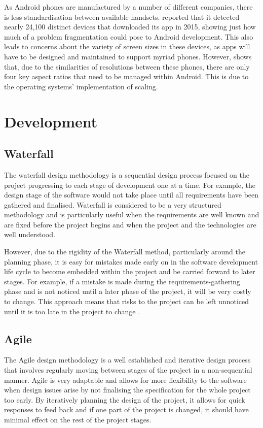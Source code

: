 As Android phones are manufactured by a number of different companies, there is less standardisation between available handsets. 
\cite{uniqueandroiddevices} reported that it detected nearly 24,100 distinct devices that downloaded its app in 2015, showing just how much of a problem fragmentation could pose to Android development.
This also leads to concerns about the variety of screen sizes in these devices, as apps will have to be designed and maintained to support myriad phones. 
However, \cite{androidscreenfragmentation} shows that, due to the similarities of resolutions between these phones, there are only four key aspect ratios that need to be managed within Android. This is due to the operating systems' implementation of scaling.

\section{Development}
\subsection{Waterfall}
The waterfall design methodology is a sequential design process focused on the project progressing to each stage of development one at a time. 
For example, the design stage of the software would not take place until all requirements have been gathered and finalised.
Waterfall is considered to be a very structured methodology and is particularly useful when the requirements are well known and are fixed before the project begins and when the project and the technologies are well understood.

However, due to the rigidity of the Waterfall method, particularly around the planning phase, it is easy for mistakes made early on in the software development life cycle to become embedded within the project and be carried forward to later stages.
For example, if a mistake is made during the requirements-gathering phase and is not noticed until a later phase of the project, it will be very costly to change.
This approach means that risks to the project can be left unnoticed until it is too late in the project to change \citep{kruchten2001waterfall}. %

\subsection{Agile}
The Agile design methodology is a well established and iterative design process that involves regularly moving between stages of the project in a non-sequential manner. 
Agile is very adaptable and allows for more flexibility to the software when design issues arise by not finalising the specification for the whole project too early.
By iteratively planning the design of the project, it allows for quick responses to feed back and if one part of the project is changed, it should have minimal effect on the rest of the project stages. 

